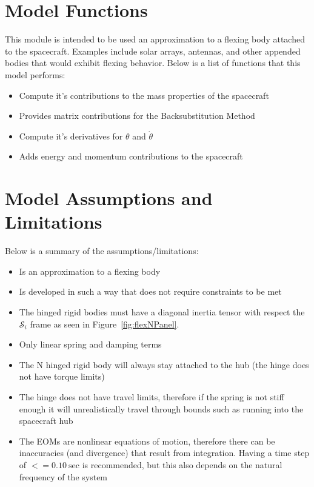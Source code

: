 \section{Model Functions}

This module is intended to be used an approximation to a flexing body attached to the spacecraft. Examples include solar arrays, antennas, and other appended bodies that would exhibit flexing behavior. Below is a list of functions that this model performs:

\begin{itemize}
	\item Compute it's contributions to the mass properties of the spacecraft
	\item Provides matrix contributions for the Backsubstitution Method
	\item Compute it's derivatives for $\theta$ and $\dot{\theta}$
	\item Adds energy and momentum contributions to the spacecraft
\end{itemize}

\section{Model Assumptions and Limitations}
Below is a summary of the assumptions/limitations:

\begin{itemize}
	\item Is an approximation to a flexing body
	\item Is developed in such a way that does not require constraints to be met
	\item The hinged rigid bodies must have a diagonal inertia tensor with respect the $\mathcal{S}_i$ frame as seen in Figure~\ref{fig:flexNPanel}.
	\item Only linear spring and damping terms
	\item The N hinged rigid body will always stay attached to the hub (the hinge does not have torque limits)
	\item The hinge does not have travel limits, therefore if the spring is not stiff enough it will unrealistically travel through bounds such as running into the spacecraft hub
	\item The EOMs are nonlinear equations of motion, therefore there can be inaccuracies (and divergence) that result from integration. Having a time step of $<= 0.10\ \text{sec}$ is recommended, but this also depends on the natural frequency of the system
\end{itemize}
